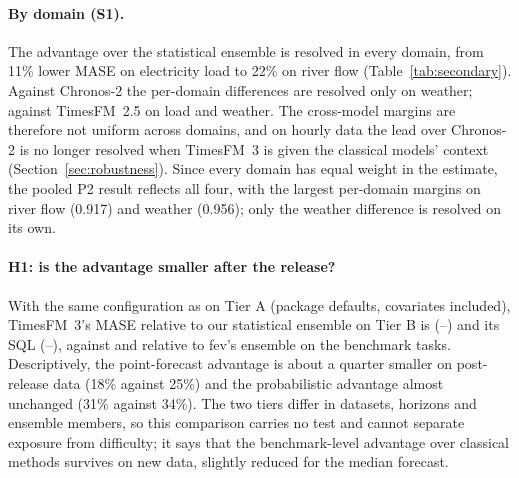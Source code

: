 \paragraph{By domain (S1).} The advantage over the statistical ensemble is resolved in every domain, from 11\% lower MASE on
electricity load to 22\% on river flow (Table~\ref{tab:secondary}). Against Chronos-2 the per-domain differences are resolved only
on weather; against TimesFM~2.5 on load and weather. The cross-model margins are therefore not uniform across domains, and on hourly data the lead over Chronos-2 is no longer resolved
when TimesFM~3 is given the classical models' context (Section~\ref{sec:robustness}). Since every domain has equal
weight in the estimate, the pooled P2 result reflects all four, with the largest per-domain margins on river flow (0.917) and weather
(0.956); only the weather difference is resolved on its own.

\paragraph{H1: is the advantage smaller after the release?} With the same configuration as on Tier A (package defaults, covariates
included), TimesFM~3's MASE relative to our statistical ensemble on Tier B is \HoneBMase{} (\HoneBMaseLo--\HoneBMaseHi) and its SQL
\HoneBSql{} (\HoneBSqlLo--\HoneBSqlHi), against \HoneAMase{} and \HoneASql{} relative to fev's ensemble on the benchmark tasks.
Descriptively, the point-forecast advantage is about a quarter smaller on post-release data (18\% against 25\%) and the
probabilistic advantage almost unchanged (31\% against 34\%). The two tiers differ in datasets, horizons and ensemble members, so
this comparison carries no test and cannot separate exposure from difficulty; it says that the benchmark-level advantage over
classical methods survives on new data, slightly reduced for the median forecast.

